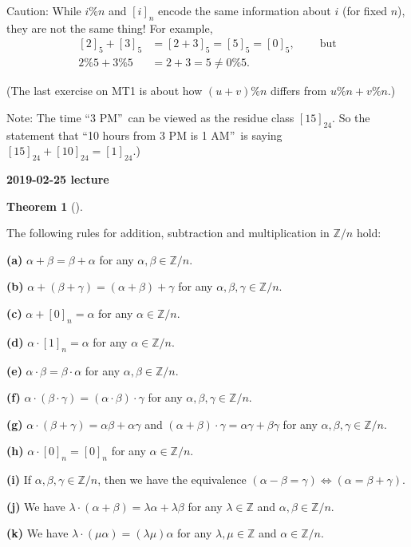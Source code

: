 \documentclass[numbers=enddot,12pt,final,onecolumn,notitlepage]{scrartcl}%
\newcounter{exer}
\numberwithin{exer}{subsection}
\theoremstyle{definition}
\newtheorem{theo}{Theorem}[subsection]
\newenvironment{theorem}[1][]
{\begin{theo}[#1]\begin{leftbar}}
{\end{leftbar}\end{theo}}
\begin{document}
Caution: While $i\%n$ and $\left[  i\right]  _{n}$ encode the same information
about $i$ (for fixed $n$), they are not the same thing! For example,%
\begin{align*}
\left[  2\right]  _{5}+\left[  3\right]  _{5}  &  =\left[  2+3\right]
_{5}=\left[  5\right]  _{5}=\left[  0\right]  _{5}%
,\ \ \ \ \ \ \ \ \ \ \text{but}\\
2\%5+3\%5  &  =2+3=5\neq0\%5.
\end{align*}


(The last exercise on MT1 is about how $\left(  u+v\right)  \%n$ differs from
$u\%n+v\%n$.)

Note: The time \textquotedblleft3 PM\textquotedblright\ can be viewed as the
residue class $\left[  15\right]  _{24}$. So the statement that
\textquotedblleft10 hours from 3 PM is 1 AM\textquotedblright\ is saying
$\left[  15\right]  _{24}+\left[  10\right]  _{24}=\left[  1\right]  _{24}$.)

\begin{center}
\textbf{2019-02-25 lecture}
\end{center}

\begin{theorem}
\label{thm.equiv.Z/n.rules}The following rules for addition, subtraction and
multiplication in $\mathbb{Z}/n$ hold:

\textbf{(a)} $\alpha+\beta=\beta+\alpha$ for any $\alpha,\beta\in\mathbb{Z}/n$.

\textbf{(b)} $\alpha+\left(  \beta+\gamma\right)  =\left(  \alpha
+\beta\right)  +\gamma$ for any $\alpha,\beta,\gamma\in\mathbb{Z}/n$.

\textbf{(c)} $\alpha+\left[  0\right]  _{n}=\alpha$ for any $\alpha
\in\mathbb{Z}/n$.

\textbf{(d)} $\alpha\cdot\left[  1\right]  _{n}=\alpha$ for any $\alpha
\in\mathbb{Z}/n$.

\textbf{(e)} $\alpha\cdot\beta=\beta\cdot\alpha$ for any $\alpha,\beta
\in\mathbb{Z}/n$.

\textbf{(f)} $\alpha\cdot\left(  \beta\cdot\gamma\right)  =\left(  \alpha
\cdot\beta\right)  \cdot\gamma$ for any $\alpha,\beta,\gamma\in\mathbb{Z}/n$.

\textbf{(g)} $\alpha\cdot\left(  \beta+\gamma\right)  =\alpha\beta
+\alpha\gamma$ and $\left(  \alpha+\beta\right)  \cdot\gamma=\alpha
\gamma+\beta\gamma$ for any $\alpha,\beta,\gamma\in\mathbb{Z}/n$.

\textbf{(h)} $\alpha\cdot\left[  0\right]  _{n}=\left[  0\right]  _{n}$ for
any $\alpha\in\mathbb{Z}/n$.

\textbf{(i)} If $\alpha,\beta,\gamma\in\mathbb{Z}/n$, then we have the
equivalence $\left(  \alpha-\beta=\gamma\right)  \Longleftrightarrow\left(
\alpha=\beta+\gamma\right)  $.

\textbf{(j)} We have $\lambda\cdot\left(  \alpha+\beta\right)  =\lambda
\alpha+\lambda\beta$ for any $\lambda\in\mathbb{Z}$ and $\alpha,\beta
\in\mathbb{Z}/n$.

\textbf{(k)} We have $\lambda\cdot\left(  \mu\alpha\right)  =\left(
\lambda\mu\right)  \alpha$ for any $\lambda,\mu\in\mathbb{Z}$ and $\alpha
\in\mathbb{Z}/n$.
\end{theorem}
\end{document}
